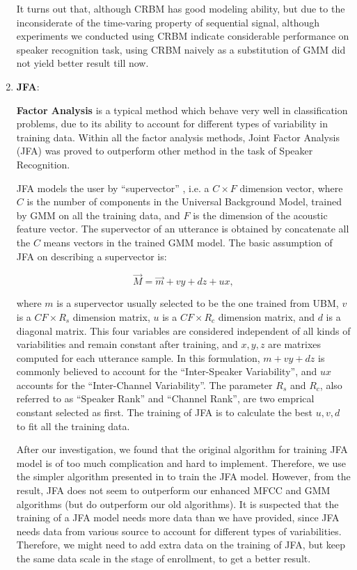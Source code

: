 \begin{enumerate}
			It turns out that, although CRBM has good modeling ability, but
			due to the inconsiderate of the time-varing property of sequential
			signal, although experiments we conducted using CRBM indicate
			considerable performance on speaker recognition task, using CRBM
			naively as a substitution of GMM did not yield better result till now.

		\item \textbf{JFA}:

          \textbf{Factor Analysis} is a typical method which behave
          very well in classification problems, due to its ability to
          account for different types of variability in training data.
          Within all the factor analysis methods,
          Joint Factor Analysis (JFA)\cite{jfa2,jfa-se} was proved to outperform other method
          in the task of Speaker Recognition.

          JFA models the user by ``supervector'' , i.e. a $C\times F $ dimension vector, where $C$ is
          the number of components in the Universal Background Model, trained by GMM on all the training data,
          and $ F$ is the dimension of the acoustic feature vector. The supervector of an utterance is obtained by concatenate
          all the $C $ means vectors in the trained GMM model. The basic assumption of JFA on describing a supervector is:

          \[ \vec{M} = \vec{ m } + vy + dz + ux, \]

          where $m$ is a supervector usually selected to be the one trained from UBM, $v$ is a $ CF \times R_s$ dimension matrix,
          $ u$ is a $ CF \times R_c$ dimension matrix, and $d$ is a diagonal matrix.
          This four variables are considered independent of all kinds of variabilities and remain constant after training, and
          $x, y, z $ are matrixes computed for each utterance sample.
          In this formulation, $ m + vy + dz$ is commonly believed to account for the ``Inter-Speaker Variability'', and $ux $ accounts
          for the ``Inter-Channel Variability''.
          The parameter $ R_s $ and $ R_c$, also referred to as ``Speaker Rank'' and ``Channel Rank'', are two emprical constant selected as first.
          The training of JFA is to calculate the best $ u, v, d$ to fit all the training data.

          After our investigation, we found that the original algorithm \cite{jfa-se} for training JFA model is of
          too much complication and hard to implement.
          Therefore, we use the simpler algorithm presented in \cite{jfa-study}
          to train the JFA model. However, from the result, JFA does not seem to outperform our enhanced MFCC and GMM algorithms
          (but do outperform our old algorithms). It is suspected that the training of a JFA model needs more data than
          we have provided, since JFA needs data from various source to account for different types of variabilities.
          Therefore, we might need to add extra data on the training of JFA, but keep the same data scale in the stage of enrollment,
          to get a better result.


\end{enumerate}
